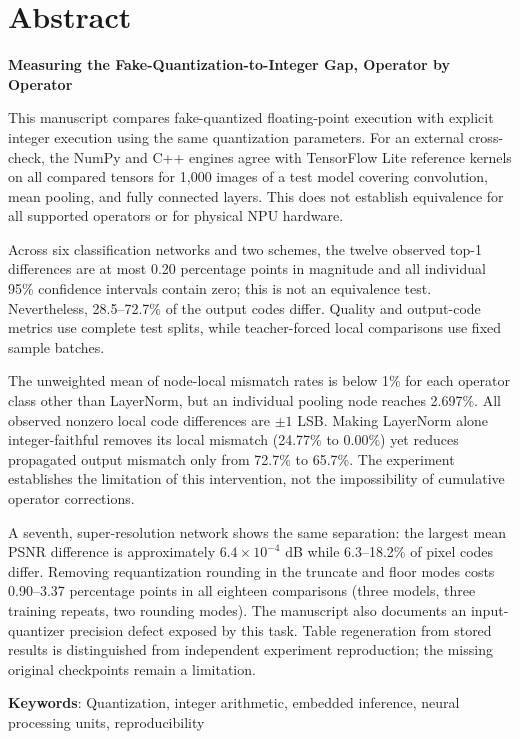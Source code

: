 \documentclass[11pt,a4paper,oneside]{report}
\begin{document}
\chapter*{Abstract}

\noindent\textbf{Measuring the Fake-Quantization-to-Integer Gap, Operator by Operator}

\bigskip
\noindent This manuscript compares fake-quantized floating-point execution with explicit integer
execution using the same quantization parameters. For an external cross-check, the NumPy and C++ engines
agree with TensorFlow Lite reference kernels on all compared tensors for 1,000 images of a test model
covering convolution, mean pooling, and fully connected layers. This does not establish equivalence for
all supported operators or for physical NPU hardware.

Across six classification networks and two schemes, the twelve observed top-1 differences are at most
0.20 percentage points in magnitude and all individual 95\% confidence intervals contain zero; this is
not an equivalence test. Nevertheless, 28.5--72.7\% of the output codes differ. Quality and output-code
metrics use complete test splits, while teacher-forced local comparisons use fixed sample batches.

The unweighted mean of node-local mismatch rates is below 1\% for each operator class other than
LayerNorm, but an individual pooling node reaches 2.697\%. All observed nonzero local code differences
are $\pm1$ LSB. Making LayerNorm alone integer-faithful removes its local mismatch (24.77\% to 0.00\%)
yet reduces propagated output mismatch only from 72.7\% to 65.7\%. The experiment establishes the
limitation of this intervention, not the impossibility of cumulative operator corrections.

A seventh, super-resolution network shows the same separation: the largest mean PSNR difference is
approximately $6.4\times10^{-4}$ dB while 6.3--18.2\% of pixel codes differ. Removing requantization
rounding in the truncate and floor modes costs 0.90--3.37 percentage points in all eighteen comparisons
(three models, three training repeats, two rounding modes). The manuscript also documents an input-quantizer
precision defect exposed by this task. Table regeneration from stored results is distinguished from independent
experiment reproduction; the missing original checkpoints remain a limitation.

\bigskip
\noindent\textbf{Keywords}: Quantization, integer arithmetic, embedded inference, neural processing units,
reproducibility
\end{document}
